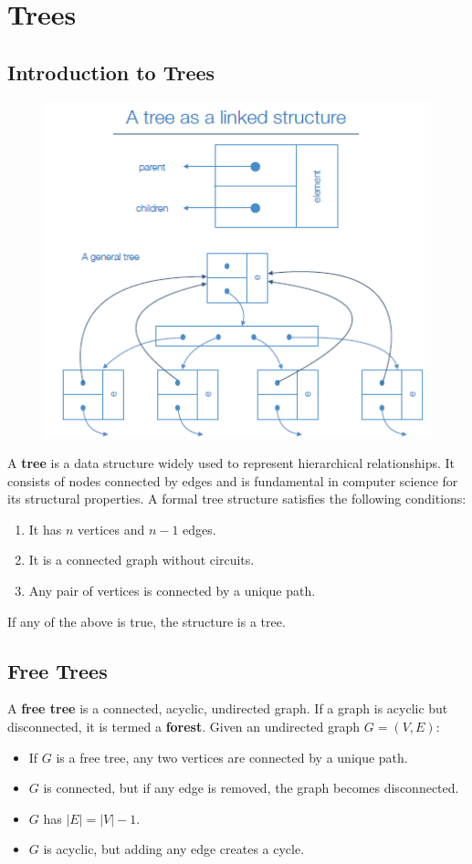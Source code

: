 \chapter{Trees}

\section{Introduction to Trees}
\begin{figure}[h!]
    \centering
    \includegraphics[width=0.75\linewidth]{immagini/general tree.png}
    \label{fig:enter-label}
\end{figure}
A \textbf{tree} is a data structure widely used to represent hierarchical relationships. It consists of nodes connected by edges and is fundamental in computer science for its structural properties. A formal tree structure satisfies the following conditions:
\begin{enumerate}
    \item It has \( n \) vertices and \( n - 1 \) edges.
    \item It is a connected graph without circuits.
    \item Any pair of vertices is connected by a unique path.
\end{enumerate}
If any of the above is true, the structure is a tree.

\section{Free Trees}
A \textbf{free tree} is a connected, acyclic, undirected graph. If a graph is acyclic but disconnected, it is termed a \textbf{forest}. Given an undirected graph \( G = (V, E) \):
\begin{itemize}
    \item If \( G \) is a free tree, any two vertices are connected by a unique path.
    \item \( G \) is connected, but if any edge is removed, the graph becomes disconnected.
    \item \( G \) has \( |E| = |V| - 1 \).
    \item \( G \) is acyclic, but adding any edge creates a cycle.
\end{itemize}

